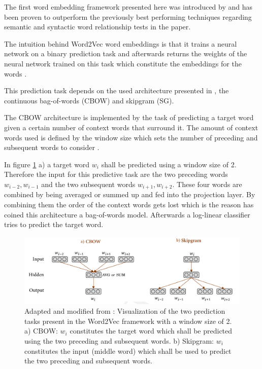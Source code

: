 The first word embedding framework presented here was introduced by \citet{mikolov2013efficient} and has been proven to outperform the previously best performing techniques regarding semantic and syntactic word relationship tests in the paper.

The intuition behind Word2Vec word embeddings is that it trains a neural network on a binary prediction task and afterwards returns the weights of the neural network trained on this task which constitute the embeddings for the words \citep{embedding2020pilehvar}.

This prediction task depends on the used architecture presented in \citet{mikolov2013efficient}, the continuous bag-of-words (CBOW) and skipgram (SG).

The CBOW architecture is implemented by the task of predicting a target word given a certain number of context words that surround it. The amount of context words used is defined by the window size which sets the number of preceding and subsequent words to consider \citep{rehurek2022w2v}.

In figure \ref{fig:w2v} a) a target word $w_i$ shall be predicted using a window size of 2. Therefore the input for this predictive task are the two preceding words $w_{i-2}, w_{i-1}$ and the two subsequent words $w_{i+1},w_{i+2}$.
These four words are combined by being averaged or summed up and fed into the projection layer. By combining them the order of the context words gets lost which is the reason \citet{mikolov2013efficient} has coined this architecture a bag-of-words model. Afterwards a log-linear classifier tries to predict the target word.

\begin{figure}
    \includegraphics[width=\linewidth]{Pictures/Pilehvar_20_w2v.png}
    \caption{Adapted and modified from \citet{embedding2020pilehvar}: Visualization of the two prediction tasks present in the Word2Vec framework with a window size of 2. \newline 
    a) CBOW: $w_i$ constitutes the target word which shall be predicted using the two preceding and subsequent words. \newline
    b) Skipgram: $w_i$ constitutes the input (middle word) which shall be used to predict the two preceding and subsequent words.}
    \label{fig:w2v}
\end{figure}

